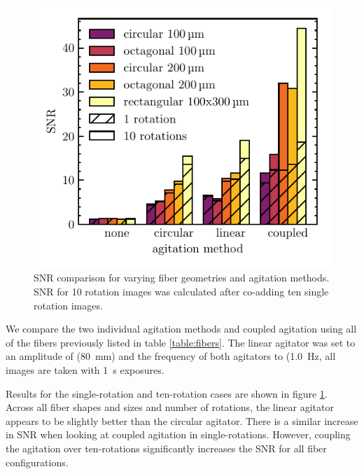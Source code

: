 \documentclass[twocolumn]{emulateapj}
\begin{document}
\begin{figure}
\centering
	\includegraphics[width=\columnwidth]{images/ag_snr.pdf}
	\caption{SNR comparison for varying fiber geometries and agitation methods. SNR for 10 rotation images was calculated after co-adding ten single rotation images.}
\label{fig:ag_snr}
\end{figure}

We compare the two individual agitation methods and coupled agitation using all of the fibers previously listed in table \ref{table:fibers}. The linear agitator was set to an amplitude of (\SI{80}{\milli\meter}) and the frequency of both agitators to (\SI{1.0}{\hertz}, all images are taken with \SI{1}{\second} exposures.

Results for the single-rotation and ten-rotation cases are shown in figure \ref{fig:ag_snr}. Across all fiber shapes and sizes and number of rotations, the linear agitator appears to be slightly better than the circular agitator. There is a similar increase in SNR when looking at coupled agitation in single-rotations. However, coupling the agitation over ten-rotations significantly increases the SNR for all fiber configurations.
\end{document}
